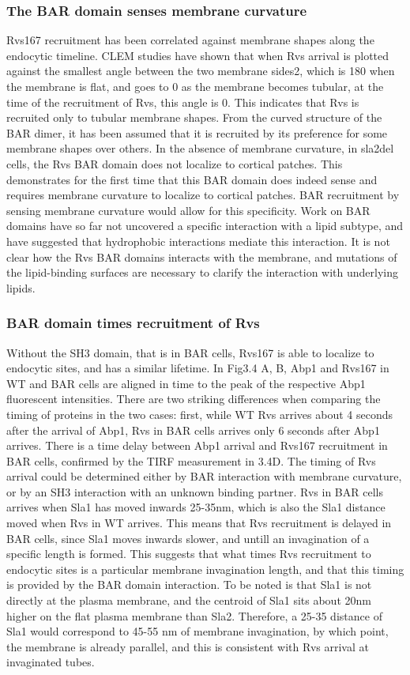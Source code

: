 \subsubsection{The BAR domain senses membrane curvature}
Rvs167 recruitment has been correlated against membrane shapes along the endocytic timeline. CLEM studies have shown that when Rvs arrival is plotted against the smallest angle between the two membrane sides2, which is 180 when the membrane is flat, and goes to 0 as the membrane becomes tubular, at the time of the recruitment of Rvs, this angle is 0. This indicates that Rvs is recruited only to tubular membrane shapes. From the curved structure of the BAR dimer, it has been assumed that it is recruited by its preference for some membrane shapes over others. In the absence of membrane curvature, in sla2del cells, the Rvs BAR domain does not localize to cortical patches. This demonstrates for the first time that this BAR domain does indeed sense and requires membrane curvature to localize to cortical patches. BAR recruitment by sensing membrane curvature would allow for this specificity. Work on BAR domains have so far not uncovered a specific interaction with a lipid subtype, and have suggested that hydrophobic interactions mediate this interaction. It is not clear how the Rvs BAR domains interacts with the membrane, and mutations of the lipid-binding surfaces are necessary to clarify the interaction with underlying lipids.

\subsubsection{BAR domain times recruitment of Rvs} 

Without the SH3 domain, that is in BAR cells, Rvs167 is able to localize to endocytic sites, and has a similar lifetime. In Fig3.4 A, B, Abp1 and Rvs167 in WT and BAR cells are aligned in time to the peak of the respective Abp1 fluorescent intensities. There are two striking differences when comparing the timing of proteins in the two cases: first, while WT Rvs arrives about 4 seconds after the arrival of Abp1, Rvs in BAR cells arrives only 6 seconds after Abp1 arrives. There is a time delay between Abp1 arrival and Rvs167 recruitment in BAR cells, confirmed by the TIRF measurement in 3.4D. 
The timing of Rvs arrival could be determined either by BAR interaction with membrane curvature, or by an SH3 interaction with an unknown binding partner. Rvs in BAR cells arrives when Sla1 has moved inwards 25-35nm, which is also the Sla1 distance moved when Rvs in WT arrives. This means that Rvs recruitment is delayed in BAR cells, since Sla1 moves inwards slower, and untill an invagination of a specific length is formed. This suggests that what times Rvs recruitment to endocytic sites is a particular membrane invagination length, and that this timing is provided by the BAR domain interaction. To be noted is that Sla1 is not directly at the plasma membrane, and the centroid of Sla1 sits about 20nm higher on the flat plasma membrane than Sla2. Therefore, a 25-35 distance of Sla1 would correspond to 45-55 nm of membrane invagination, by which point, the membrane is already parallel, and this is consistent with Rvs arrival at invaginated tubes. 

